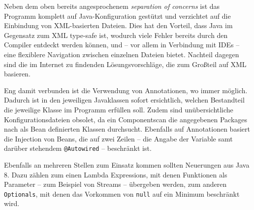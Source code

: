 Neben dem oben bereits angesprochenem \textit{separation of concerns} ist das Programm komplett auf Java-Konfiguration gestützt und verzichtet auf die Einbindung von XML-basierten Dateien. Dies hat den Vorteil, dass Java im Gegensatz zum XML type-safe ist, wodurch viele Fehler bereits durch den Compiler entdeckt werden können, und -- vor allem in Verbindung mit IDEs -- eine flexiblere Navigation zwischen einzelnen Dateien bietet. Nachteil dagegen sind die im Internet zu findenden Lösungsvorschläge, die zum Großteil auf XML basieren.

Eng damit verbunden ist die Verwendung von Annotationen, wo immer möglich. Dadurch ist in den jeweiligen Javaklassen sofort ersichtlich, welchen Bestandteil die jeweilige Klasse im Programm erfüllen soll. Zudem sind unübersichtliche Konfigurationsdateien obsolet, da ein Componentscan die angegebenen Packages nach als Bean definierten Klassen durchsucht. Ebenfalls auf Annotationen basiert die Injection von Beans, die auf zwei Zeilen -- die Angabe der Variable samt darüber stehendem \texttt{@Autowired} -- beschränkt ist.

Ebenfalls an mehreren Stellen zum Einsatz kommen sollten Neuerungen aus Java 8. Dazu zählen zum einen Lambda Expressions, mit denen Funktionen als Parameter -- zum Beispiel von Streams -- übergeben werden, zum anderen \texttt{Optionals}, mit denen das Vorkommen von \texttt{null} auf ein Minimum beschränkt wird.